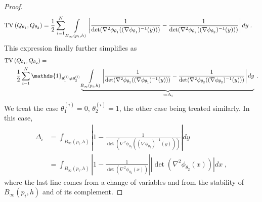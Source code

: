 \documentclass{article}
\theoremstyle{plain}
\theoremstyle{definition}
\theoremstyle{remark}
\newcommand{\Ind}[0]{\mathds{1}}
\newcommand{\eqdef}{\vcentcolon=}
\newcommand\tv[2]{\mathrm{TV}\left( {#1}, {#2} \right)}
\begin{document}
\begin{proof}
\begin{equation}
    \begin{aligned}
        &\tv{Q_{\theta_1}}{Q_{\theta_2}} 
        = \frac{1}{2} \sum_{i=1}^{N} \int \displaylimits_{B_{\infty}(p_i, h)} \left| \frac{1}{\det(\nabla^2 \phi_{\theta_1}((\nabla \phi_{\theta_1})^{-1}(y)))} - \frac{1}{\det(\nabla^2 \phi_{\theta_2}((\nabla \phi_{\theta_2})^{-1}(y)))} \right| dy
        \;.
    \end{aligned}
\end{equation}
This expression finally further simplifies as
\begin{equation}
\label{eq:ojhkfjqhsdlkjblkjqsdg}
    \begin{aligned}
        &\tv{Q_{\theta_1}}{Q_{\theta_2}} 
        = \\
        &\quad\quad \frac{1}{2} \sum_{i=1}^{N} \Ind_{\theta_1^{(i)} \neq \theta_2^{(i)}} \underbrace{\int \displaylimits_{B_{\infty}(p_i, h)} \left| \frac{1}{\det(\nabla^2 \phi_{\theta_1}((\nabla \phi_{\theta_1})^{-1}(y)))} - \frac{1}{\det(\nabla^2 \phi_{\theta_2}((\nabla \phi_{\theta_2})^{-1}(y)))} \right| dy}_{\eqdef \Delta_i}
        \;.
    \end{aligned}
\end{equation}
We treat the case $\theta_1^{(i)}=0$, $\theta_2^{(i)}=1$, the other case being treated similarly.
In this case, 
\begin{equation}
    \begin{aligned}
        \Delta_i &= \int_{B_{\infty}(p_i, h)} \left| 1 - \frac{1}{\det(\nabla^2 \phi_{\theta_2}((\nabla \phi_{\theta_2})^{-1}(y)))} \right| dy \\
        &= \int_{B_{\infty}(p_i, h)} \left| 1 - \frac{1}{\det(\nabla^2 \phi_{\theta_2}(x))} \right| |\det(\nabla^2 \phi_{\theta_2}(x))| dx \;,
    \end{aligned}
\end{equation}
   where the last line comes from a change of variables and from the stability of $B_{\infty}(p_i, h)$ and of its complement.



\end{proof}
\end{document}
